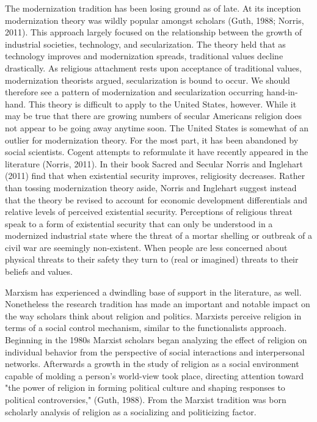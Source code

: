 \documentclass{article}
\begin{document}
The modernization tradition has been losing ground as of late.  At its inception modernization theory was wildly popular amongst scholars (Guth, 1988; Norris, 2011).  This approach largely focused on the relationship between the growth of industrial societies, technology, and secularization.  The theory held that as technology improves and modernization spreads, traditional values decline drastically.  As religious attachment rests upon acceptance of traditional values, modernization theorists argued, secularization is bound to occur.  We should therefore see a pattern of modernization and secularization occurring hand-in-hand.  This theory is difficult to apply to the United States, however.  While it may be true that there are growing numbers of secular Americans religion does not appear to be going away anytime soon.  The United States is somewhat of an outlier for modernization theory.  For the most part, it has been abandoned by social scientists.  Cogent attempts to reformulate it have recently appeared in the literature (Norris, 2011).  In their book Sacred and Secular Norris and Inglehart (2011) find that when existential security improves, religiosity decreases.  Rather than tossing modernization theory aside, Norris and Inglehart suggest instead that the theory be revised to account for economic development differentials and relative levels of perceived existential security.  Perceptions of religious threat speak to a form of existential security that can only be understood in a modernized industrial state where the threat of a mortar shelling or outbreak of a civil war are seemingly non-existent. When people are less concerned about physical threats to their safety they turn to (real or imagined) threats to their beliefs and values.

Marxism has experienced a dwindling base of support in the literature, as well.  Nonetheless the research tradition has made an important and notable impact on the way scholars think about religion and politics.  Marxists perceive religion in terms of a social control mechanism, similar to the functionalists approach.  Beginning in the 1980s Marxist scholars began analyzing the effect of religion on individual behavior from the perspective of social interactions and interpersonal networks.  Afterwards a growth in the study of religion as a social environment capable of molding a person's world-view took place, directing attention toward "the power of religion in forming political culture and shaping responses to political controversies," (Guth, 1988).  From the Marxist tradition was born scholarly analysis of religion as a socializing and politicizing factor.
\end{document}
